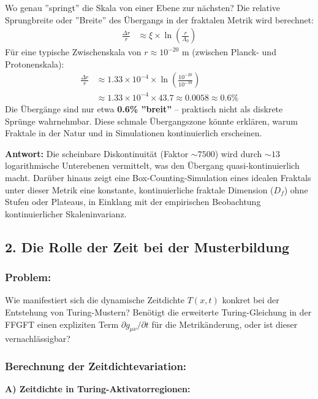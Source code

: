 Wo genau ''springt'' die Skala von einer Ebene zur nächsten? Die relative Sprungbreite oder ''Breite'' des Übergangs in der fraktalen Metrik wird berechnet:
\begin{align*}
	\frac{\Delta r}{r} &\approx \xi \times \ln\left(\frac{r}{\Lambda_0}\right)
\end{align*}
Für eine typische Zwischenskala von $r \approx 10^{-20}$ m (zwischen Planck- und Protonenskala):
\begin{align*}
	\frac{\Delta r}{r} &\approx 1.33 \times 10^{-4} \times \ln\left(\frac{10^{-20}}{10^{-39}}\right) \\
	&\approx 1.33 \times 10^{-4} \times 43.7 \approx 0.0058 \approx 0.6\%
\end{align*}
Die Übergänge sind nur etwa \textbf{0.6\% ''breit''} – praktisch nicht als diskrete Sprünge wahrnehmbar. Diese schmale Übergangszone könnte erklären, warum Fraktale in der Natur und in Simulationen kontinuierlich erscheinen.

\textbf{Antwort:} Die scheinbare Diskontinuität (Faktor $\sim 7500$) wird durch $\sim 13$ logarithmische Unterebenen vermittelt, was den Übergang quasi-kontinuierlich macht. Darüber hinaus zeigt eine Box-Counting-Simulation eines idealen Fraktals unter dieser Metrik eine konstante, kontinuierliche fraktale Dimension ($D_f$) ohne Stufen oder Plateaus, in Einklang mit der empirischen Beobachtung kontinuierlicher Skaleninvarianz.

\subsection*{2. Die Rolle der Zeit bei der Musterbildung}

\subsubsection*{Problem:}
Wie manifestiert sich die dynamische Zeitdichte $T(x,t)$ konkret bei der Entstehung von Turing-Mustern? Benötigt die erweiterte Turing-Gleichung in der FFGFT einen expliziten Term $\partial g_{\mu\nu}/\partial t$ für die Metrikänderung, oder ist dieser vernachlässigbar?

\subsubsection*{Berechnung der Zeitdichtevariation:}

\textbf{A) Zeitdichte in Turing-Aktivatorregionen:}

